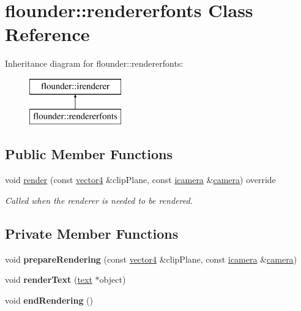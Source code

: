 \hypertarget{classflounder_1_1rendererfonts}{}\section{flounder\+:\+:rendererfonts Class Reference}
\label{classflounder_1_1rendererfonts}
Inheritance diagram for flounder\+:\+:rendererfonts\+:\begin{figure}[H]
\begin{center}
\leavevmode
\includegraphics[height=2.000000cm]{classflounder_1_1rendererfonts}
\end{center}
\end{figure}
\subsection*{Public Member Functions}
\begin{DoxyCompactItemize}
\item 
void \hyperlink{classflounder_1_1rendererfonts_a7702e992c6546d06019ce2ef1bf68c33}{render} (const \hyperlink{classflounder_1_1vector4}{vector4} \&clip\+Plane, const \hyperlink{classflounder_1_1icamera}{icamera} \&\hyperlink{classflounder_1_1camera}{camera}) override
\begin{DoxyCompactList}\small\item\em Called when the renderer is needed to be rendered. \end{DoxyCompactList}\end{DoxyCompactItemize}
\subsection*{Private Member Functions}
\begin{DoxyCompactItemize}
\item 
\mbox{\label{classflounder_1_1rendererfonts_aa405a8c6f3fc0553d65b83a9f688f0f9}} 
void {\bfseries prepare\+Rendering} (const \hyperlink{classflounder_1_1vector4}{vector4} \&clip\+Plane, const \hyperlink{classflounder_1_1icamera}{icamera} \&\hyperlink{classflounder_1_1camera}{camera})
\item 
\mbox{\label{classflounder_1_1rendererfonts_a8d9aa4059181677c412caa0e97142b45}} 
void {\bfseries render\+Text} (\hyperlink{classflounder_1_1text}{text} $\ast$object)
\item 
\mbox{\label{classflounder_1_1rendererfonts_a5d040035dfcef8f82526492a5655758b}} 
void {\bfseries end\+Rendering} ()
\end{DoxyCompactItemize}

